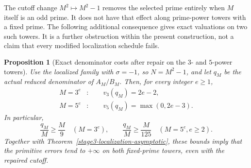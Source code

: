 \documentclass[11pt,a4paper]{article}
\newtheorem{proposition}[theorem]{Proposition}
\theoremstyle{definition}
\theoremstyle{remark}
\begin{document}
The cutoff change $M^2\mapsto M^2-1$ removes the selected prime
entirely when $M$ itself is an odd prime.  It does not have that
effect along prime-power towers with a fixed prime.  The following
additional consequence gives exact valuations on two such towers.
It is a further obstruction within the present construction, not a
claim that every modified localization schedule fails.

\begin{proposition}[Exact denominator costs after repair on the $3$- and $5$-power towers]
\label{unified-repaired-towers}
Use the localized family with $\sigma=-1$, so
$N=M^2-1$, and let $q_M$ be the actual reduced denominator of
$A_M/B_M$.  Then, for every integer $e\ge1$,
\[
 \begin{aligned}
  M=3^e&:\qquad v_3(q_M)=2e-2,\\
  M=5^e&:\qquad v_5(q_M)=\max(0,2e-3).
 \end{aligned}
\]
In particular,
\[
 \frac{q_M}{M}\ge\frac{M}{9}\quad(M=3^e),
 \qquad
 \frac{q_M}{M}\ge\frac{M}{125}\quad(M=5^e, e\ge2).
\]
Together with Theorem~\ref{stage3-localization-asymptotic}, these
bounds imply that the primitive errors tend to $+\infty$ on
both fixed-prime towers, even with the repaired cutoff.
\end{proposition}
\end{document}
